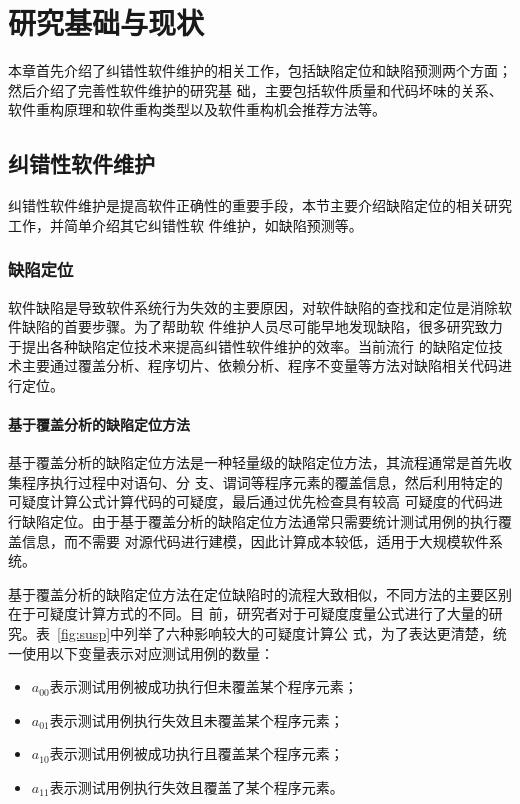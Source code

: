 
\chapter{研究基础与现状}
本章首先介绍了纠错性软件维护的相关工作，包括缺陷定位和缺陷预测两个方面；然后介绍了完善性软件维护的研究基
础，主要包括软件质量和代码坏味的关系、软件重构原理和软件重构类型以及软件重构机会推荐方法等。
\section{纠错性软件维护}
纠错性软件维护是提高软件正确性的重要手段，本节主要介绍缺陷定位的相关研究工作，并简单介绍其它纠错性软
件维护，如缺陷预测等。

\subsection{缺陷定位}
软件缺陷是导致软件系统行为失效的主要原因，对软件缺陷的查找和定位是消除软件缺陷的首要步骤。为了帮助软
件维护人员尽可能早地发现缺陷，很多研究致力于提出各种缺陷定位技术来提高纠错性软件维护的效率。当前流行
的缺陷定位技术主要通过覆盖分析、程序切片、依赖分析、程序不变量等方法对缺陷相关代码进行定位。

\subsubsection{基于覆盖分析的缺陷定位方法}
基于覆盖分析的缺陷定位方法是一种轻量级的缺陷定位方法，其流程通常是首先收集程序执行过程中对语句、分
支、谓词等程序元素的覆盖信息，然后利用特定的可疑度计算公式计算代码的可疑度，最后通过优先检查具有较高
可疑度的代码进行缺陷定位。由于基于覆盖分析的缺陷定位方法通常只需要统计测试用例的执行覆盖信息，而不需要
对源代码进行建模，因此计算成本较低，适用于大规模软件系统。

基于覆盖分析的缺陷定位方法在定位缺陷时的流程大致相似，不同方法的主要区别在于可疑度计算方式的不同。目
前，研究者对于可疑度度量公式进行了大量的研究。表~\ref{fig:susp}中列举了六种影响较大的可疑度计算公
式，为了表达更清楚，统一使用以下变量表示对应测试用例的数量：
\begin{itemize}
  \item $a_{00}$表示测试用例被成功执行但未覆盖某个程序元素；
  \item $a_{01}$表示测试用例执行失效且未覆盖某个程序元素；
  \item $a_{10}$表示测试用例被成功执行且覆盖某个程序元素；
  \item $a_{11}$表示测试用例执行失效且覆盖了某个程序元素。
\end{itemize}

